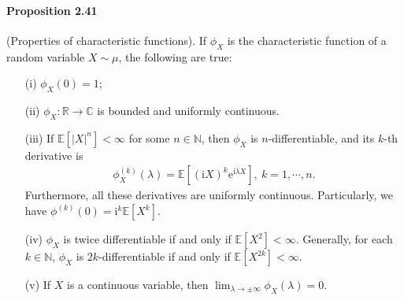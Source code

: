 \documentclass{article}
\numberwithin{equation}{section}
\newcommand{\e}{\mathrm{e}}
\newcommand{\E}{\mathbb{E}}
\renewcommand{\i}{\mathrm{i}}
\theoremstyle{plain}
\theoremstyle{definition}
\begin{document}
\paragraph{Proposition 2.41\label{def:2.41}} (Properties of characteristic functions). If $\phi_X$ is the characteristic function of a random variable $X\sim\mu$, the following are true:
\begin{itemize}
	\item[(i)] $\phi_X(0)=1$;
	\item[(ii)] $\phi_X:\mathbb{R}\to\mathbb{C}$ is bounded and uniformly continuous.
	\item[(iii)] If $\E\left[\vert X\vert^n\right]<\infty$ for some $n\in\mathbb{N}$, then $\phi_X$ is $n$-differentiable, and its $k$-th derivative is
	\begin{align*}
		\phi_X^{(k)}(\lambda)=\E\left[(\i X)^k\e^{\i\lambda X}\right],\ k=1,\cdots,n.\tag{2.13}\label{eq:2.13}
	\end{align*}
    Furthermore, all these derivatives are uniformly continuous. Particularly, we have $\phi^{(k)}(0)=\i^k\E[X^k]$.
	\item[(iv)] $\phi_X$ is twice differentiable if and only if $\E[X^2]<\infty$. Generally, for each $k\in\mathbb{N}$, $\phi_X$ is $2k$-differentiable if and only if $\E[X^{2k}]<\infty$.
	\item[(v)] If $X$ is a continuous variable, then $\lim_{\lambda\to\pm\infty}\phi_X(\lambda)=0$.
\end{itemize}
\end{document}

